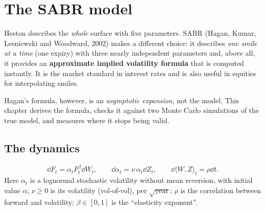 \chapter{The SABR model}
\label{cap:sabr}

Heston describes the \emph{whole} surface with five parameters. SABR (Hagan, Kumar, Lesniewski and Woodward, 2002)
makes a different choice: it describes \emph{one smile at a time} (one expiry) with three nearly independent
parameters and, above all, it provides an \textbf{approximate implied volatility formula} that is computed
instantly. It is the market standard in interest rates and is also useful in equities for interpolating smiles.

Hagan's formula, however, is an \emph{asymptotic expansion}, not the model. This chapter derives the formula,
checks it against two Monte Carlo simulations of the true model, and measures where it stops being valid.

\section{The dynamics}
\begin{equation}\label{eq:sabr}
\dd F_t=\alpha_tF_t^\beta\dd W_t,\qquad\dd\alpha_t=\nu\,\alpha_t\dd Z_t,\qquad\dd\langle W,Z\rangle_t=\rho\dd t .
\end{equation}
Here $\alpha_t$ is a lognormal stochastic volatility without mean reversion, with initial value $\alpha$; $\nu\ge0$ is
its volatility (vol-of-vol), per $\sqrt{\text{year}}$; $\rho$ is the correlation between forward and volatility;
$\beta\in[0,1]$ is the ``elasticity exponent''.


